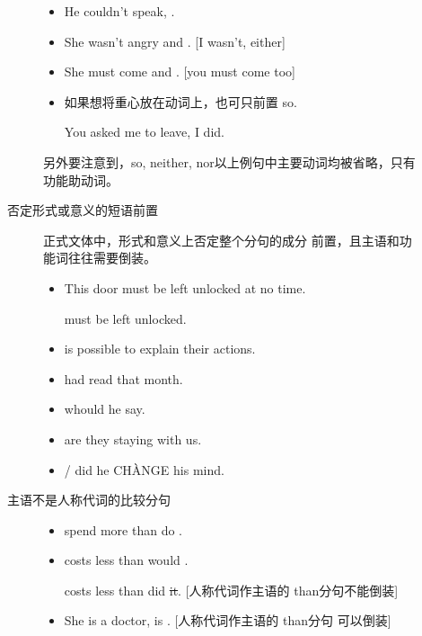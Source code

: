 \begin{description}
\begin{description}
\begin{itemize}
    \item He couldn't speak, .
    \item She wasn't angry and . [I wasn't, either]
    \item She must come and . [you must come too]

    \item 如果想将重心放在动词上，也可只前置 so.

      You asked me to leave,  I did.
    \end{itemize}

    另外要注意到，so, neither, nor以上例句中主要动词均被省略，只有功能助动词。

  \item[否定形式或意义的短语前置] 正式文体中，形式和意义上否定整个分句的成分
    前置，且主语和功能词往往需要倒装。
    \begin{itemize}
    \item This door must be left unlocked at no time.

       must  be left unlocked.

    \item {} is  possible to explain their actions.

    \item {} had  read that month.

    \item {} whould he say.

    \item {} are they staying with us.


    \item {} / did he CH\`ANGE his mind.
    \end{itemize}

  \item[主语不是人称代词的比较分句]
    \begin{itemize}

    \item {} spend more than do .

    \item {} costs less than would .

       costs less than did \sout{it}. [人称代词作主语的 than分句不能倒装]

    \item She is a doctor,  is . [人称代词作主语的 than分句
      可以倒装]


\end{itemize}
\end{description}
\end{description}
